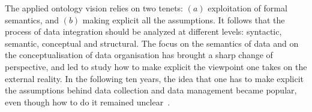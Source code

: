 \documentclass[ao]{iosart2x}
\newcommand{\nb}[1]{\textcolor{red}{$|$}\marginpar{\hspace*{-0cm}\parbox{20mm}{\scriptsize\raggedright\textcolor{red}{#1}}}}
\begin{document}
The applied ontology vision relies on two tenets: $(a)$ exploitation of formal semantics, and $(b)$ making explicit all the assumptions. It follows that the process of data integration should be analyzed at different levels: syntactic, semantic, conceptual and structural. %
The focus on the semantics of data and on the conceptualisation of data organisation has brought a sharp change of perspective, and led to study how to make explicit the viewpoint one takes on the external reality. 
In the following ten years, the idea that one has to make explicit the assumptions behind data collection and data management became popular, even though how to do it remained unclear~\citep{oukselSemanticInteroperability1999}. 
\end{document}
